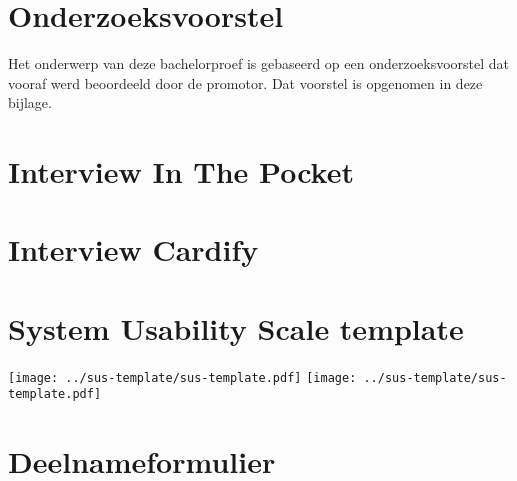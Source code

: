 \documentclass{bachproef-tin}
\begin{document}






\appendix
\renewcommand{\chaptername}{Appendix}


\chapter{Onderzoeksvoorstel}

Het onderwerp van deze bachelorproef is gebaseerd op een onderzoeksvoorstel dat vooraf werd beoordeeld door de promotor. Dat voorstel is opgenomen in deze bijlage.




\chapter{Interview In The Pocket}
\label{bijlage:interview-itp}



\chapter{Interview Cardify}
\label{bijlage:interview-cardify}



\chapter{System Usability Scale template}
\label{bijlage:sus}

\texttt{[image: ../sus-template/sus-template.pdf]}
\texttt{[image: ../sus-template/sus-template.pdf]}

\chapter{Deelnameformulier}
\label{bijlage:deelnameformulier}
\end{document}
